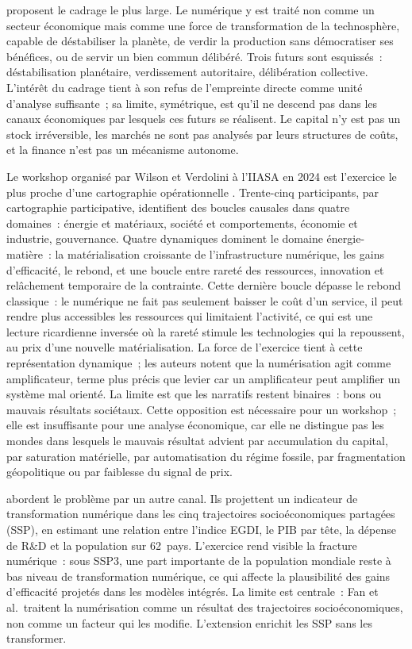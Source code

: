 \textcite{creutzig_digitalization_2022} proposent le cadrage le plus large. Le numérique y est traité non comme un secteur économique mais comme une force de transformation de la technosphère, capable de déstabiliser la planète, de verdir la production sans démocratiser ses bénéfices, ou de servir un bien commun délibéré. Trois futurs sont esquissés~: déstabilisation planétaire, verdissement autoritaire, délibération collective. L'intérêt du cadrage tient à son refus de l'empreinte directe comme unité d'analyse suffisante~; sa limite, symétrique, est qu'il ne descend pas dans les canaux économiques par lesquels ces futurs se réalisent. Le capital n'y est pas un stock irréversible, les marchés ne sont pas analysés par leurs structures de coûts, et la finance n'est pas un mécanisme autonome.

Le workshop organisé par Wilson et Verdolini à l'IIASA en 2024 est l'exercice le plus proche d'une cartographie opérationnelle \parencite{wilson_expert_2025}. Trente-cinq participants, par cartographie participative, identifient des boucles causales dans quatre domaines~: énergie et matériaux, société et comportements, économie et industrie, gouvernance. Quatre dynamiques dominent le domaine énergie-matière~: la matérialisation croissante de l'infrastructure numérique, les gains d'efficacité, le rebond, et une boucle entre rareté des ressources, innovation et relâchement temporaire de la contrainte. Cette dernière boucle dépasse le rebond classique~: le numérique ne fait pas seulement baisser le coût d'un service, il peut rendre plus accessibles les ressources qui limitaient l'activité, ce qui est une lecture ricardienne inversée où la rareté stimule les technologies qui la repoussent, au prix d'une nouvelle matérialisation. La force de l'exercice tient à cette représentation dynamique~; les auteurs notent que la numérisation agit comme amplificateur, terme plus précis que levier car un amplificateur peut amplifier un système mal orienté. La limite est que les narratifs restent binaires~: bons ou mauvais résultats sociétaux. Cette opposition est nécessaire pour un workshop~; elle est insuffisante pour une analyse économique, car elle ne distingue pas les mondes dans lesquels le mauvais résultat advient par accumulation du capital, par saturation matérielle, par automatisation du régime fossile, par fragmentation géopolitique ou par faiblesse du signal de prix.

\textcite{fan_digital_2025} abordent le problème par un autre canal. Ils projettent un indicateur de transformation numérique dans les cinq trajectoires socioéconomiques partagées (SSP), en estimant une relation entre l'indice EGDI, le PIB par tête, la dépense de R\&D et la population sur 62~pays. L'exercice rend visible la fracture numérique~: sous SSP3, une part importante de la population mondiale reste à bas niveau de transformation numérique, ce qui affecte la plausibilité des gains d'efficacité projetés dans les modèles intégrés. La limite est centrale~: Fan et al.\ traitent la numérisation comme un résultat des trajectoires socioéconomiques, non comme un facteur qui les modifie. L'extension enrichit les SSP sans les transformer.

